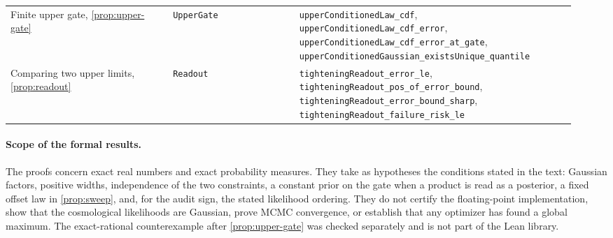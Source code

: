 \begin{table}[h]
\begin{tabular}{@{}>{\raggedright\arraybackslash}p{0.27\linewidth} >{\raggedright\arraybackslash}p{0.21\linewidth} >{\raggedright\arraybackslash}p{0.46\linewidth}@{}}
    Finite upper gate, \cref{prop:upper-gate} & \texttt{UpperGate} & \texttt{upperConditionedLaw\_\allowbreak{}cdf}, \texttt{upperConditionedLaw\_\allowbreak{}cdf\_\allowbreak{}error}, \texttt{upperConditionedLaw\_\allowbreak{}cdf\_\allowbreak{}error\_\allowbreak{}at\_\allowbreak{}gate}, \texttt{upperConditionedGaussian\_\allowbreak{}existsUnique\_\allowbreak{}quantile} \\
    Comparing two upper limits, \cref{prop:readout} & \texttt{Readout} & \texttt{tighteningReadout\_\allowbreak{}error\_\allowbreak{}le}, \texttt{tighteningReadout\_\allowbreak{}pos\_\allowbreak{}of\_\allowbreak{}error\_\allowbreak{}bound}, \texttt{tighteningReadout\_\allowbreak{}error\_\allowbreak{}bound\_\allowbreak{}sharp}, \texttt{tighteningReadout\_\allowbreak{}failure\_\allowbreak{}risk\_\allowbreak{}le} \\
    \bottomrule
  \end{tabular}
\end{table}

\paragraph{Scope of the formal results.}
The proofs concern exact real numbers and exact probability measures. They take as hypotheses the conditions stated in the text: Gaussian factors, positive widths, independence of the two constraints, a constant prior on the gate when a product is read as a posterior, a fixed offset law in \cref{prop:sweep}, and, for the audit sign, the stated likelihood ordering. They do not certify the floating-point implementation, show that the cosmological likelihoods are Gaussian, prove MCMC convergence, or establish that any optimizer has found a global maximum. The exact-rational counterexample after \cref{prop:upper-gate} was checked separately and is not part of the Lean library.
